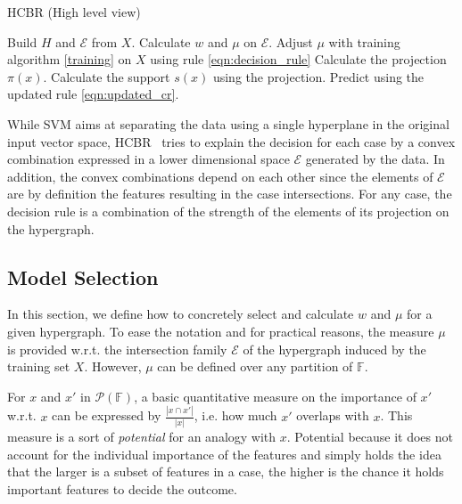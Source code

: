 \documentclass[sigconf,edbt]{acmart-edbt-workshops}
\def\HCBR{{\sc HCBR}}
\begin{document}
\algrenewcommand\algorithmicindent{1.0em}%
\begin{algorithm}
  \caption{HCBR (High level view)}\label{algo:HCBR}
  \begin{algorithmic}[1]
    \State Build $H$ and $\mathcal E$ from $X$.
    \State Calculate $w$ and $\mu$ on $\mathcal E$.
    \State Adjust $\mu$ with training algorithm \ref{training} on $X$ using rule \eqref{eqn:decision_rule}
        \State Calculate the projection $\pi(x)$.
        \State Calculate the support $s(x)$ using the projection.
        \State Predict using the updated rule \eqref{eqn:updated_cr}.
    \EndFor
  \end{algorithmic}
\end{algorithm}


While SVM aims at separating the data using a single hyperplane in the original input vector space, \HCBR~ tries to explain the decision for each case by a convex combination expressed in a lower dimensional space $\mathcal E$ generated by the data. In addition, the convex combinations depend on each other since the elements of $\mathcal E$ are by definition the features resulting in the case intersections. For any case, the decision rule is a combination of the strength of the elements of its projection on the hypergraph.

\subsection{Model Selection}
\label{sec:model_selection}

In this section, we define how to concretely select and calculate $w$ and $\mu$ for a given hypergraph. To ease the notation and for practical reasons, the measure $\mu$ is provided w.r.t. the intersection family $\mathcal E$ of the hypergraph induced by the training set $X$. However, $\mu$ can be defined over any partition of $\mathbb F$.

For $x$ and $x'$ in $\mathcal P({\mathbb F})$, a basic quantitative measure on the importance of $x'$ w.r.t. $x$ can be expressed by $\frac{|x \cap x'|}{|x|}$, i.e. how much $x'$ overlaps with $x$. This measure is a sort of {\it potential} for an analogy with $x$. Potential because it does not account for the individual importance of the features and simply holds the idea that the larger is a subset of features in a case, the higher is the chance it holds important features to decide the outcome.
\end{document}
